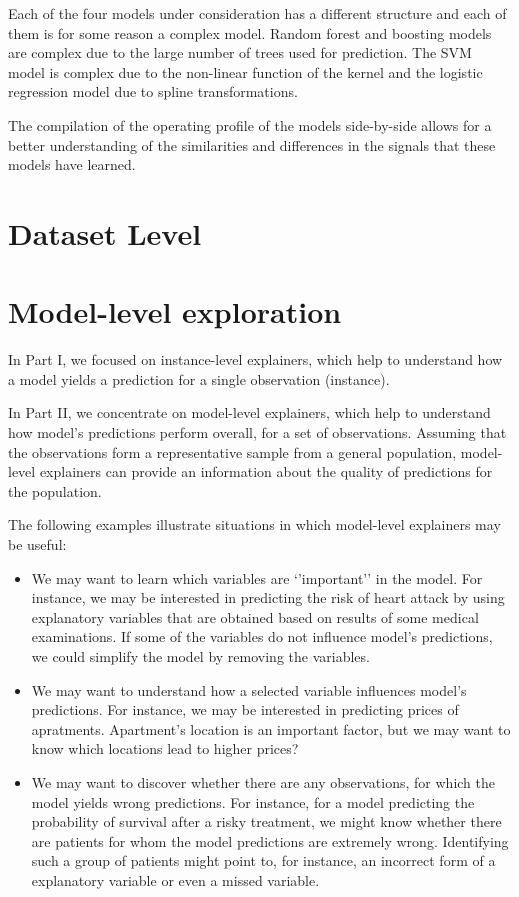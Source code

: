 \documentclass[12pt,]{krantz}
\providecommand{\tightlist}{%
  \setlength{\itemsep}{0pt}\setlength{\parskip}{0pt}}
\begin{document}
Each of the four models under consideration has a different structure and each of them is for some reason a complex model. Random forest and boosting models are complex due to the large number of trees used for prediction. The SVM model is complex due to the non-linear function of the kernel and the logistic regression model due to spline transformations.

The compilation of the operating profile of the models side-by-side allows for a better understanding of the similarities and differences in the signals that these models have learned.

\hypertarget{dataset-level}{%
\section*{Dataset Level}\label{dataset-level}}

\hypertarget{modelLevelExploration}{%
\section{Model-level exploration}\label{modelLevelExploration}}

In Part I, we focused on instance-level explainers, which help to understand how a model yields a prediction for a single observation (instance).

In Part II, we concentrate on model-level explainers, which help to understand how model's predictions perform overall, for a set of observations. Assuming that the observations form a representative sample from a general population, model-level explainers can provide an information about the quality of predictions for the population.

The following examples illustrate situations in which model-level explainers may be useful:

\begin{itemize}
\tightlist
\item
  We may want to learn which variables are `'important'' in the model. For instance, we may be interested in predicting the risk of heart attack by using explanatory variables that are obtained based on results of some medical examinations. If some of the variables do not influence model's predictions, we could simplify the model by removing the variables.
\item
  We may want to understand how a selected variable influences model's predictions. For instance, we may be interested in predicting prices of apratments. Apartment's location is an important factor, but we may want to know which locations lead to higher prices?
\item
  We may want to discover whether there are any observations, for which the model yields wrong predictions. For instance, for a model predicting the probability of survival after a risky treatment, we might know whether there are patients for whom the model predictions are extremely wrong. Identifying such a group of patients might point to, for instance, an incorrect form of a explanatory variable or even a missed variable.
\end{itemize}
\end{document}
